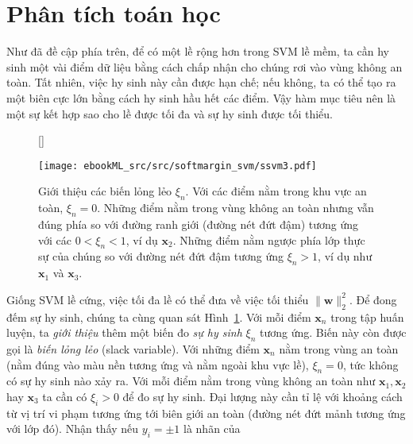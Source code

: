  
 
\section{Phân tích toán học}
 
Như đã đề cập phía trên, để có một lề rộng hơn trong SVM lề mềm, ta cần {hy sinh} một vài điểm dữ liệu bằng cách chấp nhận
cho chúng rơi vào vùng {không an toàn}. Tất nhiên, việc {hy sinh}
này cần được hạn chế; nếu không, ta có thể tạo ra một biên cực lớn bằng cách
{hy sinh} hầu hết các điểm. Vậy hàm mục tiêu nên là một sự kết hợp sao cho lề được tối đa và sự hy sinh được tối thiểu.
 
\begin{figure}[t]
    [\FBwidth]
    {\caption{ 
    Giới thiệu các biến lỏng lẻo $\xi_n$. Với các điểm nằm trong {khu vực an
    toàn}, $\xi_n = 0$.
    Những điểm nằm trong vùng
    không an toàn nhưng vẫn đúng phía so với đường ranh giới (đường nét đứt
    đậm) tương ứng với các $0 < \xi_n < 1$, ví dụ $\mathbf{x}_2$. Những điểm
    nằm ngược phía lớp thực sự của chúng so với đường nét đứt đậm tương ứng $\xi_n > 1$, ví dụ như $\mathbf{x}_1$ và $\mathbf{x}_3$.
    }
    \label{fig:20_2}}
    { %
    \texttt{[image: ebookML\_src/src/softmargin\_svm/ssvm3.pdf]}
    }
\end{figure}
Giống SVM lề cứng, việc tối đa lề có thể đưa
về việc tối thiểu $\|\mathbf{w}\|_2^2$. Để đong đếm sự hy sinh, chúng ta cùng quan sát Hình~\ref{fig:20_2}. Với mỗi điểm $\mathbf{x}_n$ trong tập huấn luyện, ta \textit{giới thiệu} thêm một biến đo \textit{sự hy
sinh} $\xi_n$ tương ứng. Biến này còn được gọi là \textit{biến lỏng lẻo} (slack variable). Với
những điểm $\mathbf{x}_n$ nằm trong {vùng an toàn} (nằm đúng vào màu nền
tương ứng và nằm ngoài khu vực lề), $\xi_n = 0$, tức không có sự
{hy sinh} nào xảy ra. Với mỗi điểm nằm trong {vùng không
an toàn} như $\mathbf{x}_1,
\mathbf{x}_2$ hay $\mathbf{x}_3$ ta cần có $\xi_i > 0$ để đo sự hy sinh. Đại lượng này cần tỉ lệ với khoảng cách từ vị trí vi phạm tương ứng tới
biên giới an toàn (đường nét đứt mảnh tương ứng với lớp đó). Nhận thấy nếu $y_i= \pm 1$ là {nhãn} của
